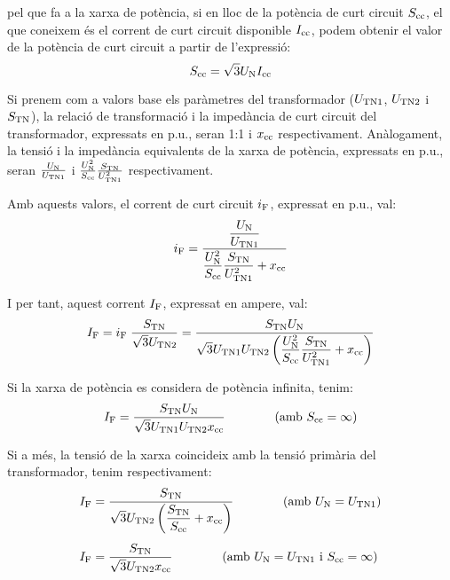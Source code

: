 pel que fa a la xarxa de pot\`{e}ncia, si en lloc de la pot\`{e}ncia de curt
circuit $S_\mathrm{cc}$, el que coneixem \'{e}s el corrent de curt circuit
disponible $I_\mathrm{cc}$, podem obtenir el valor de la pot\`{e}ncia de
curt circuit a partir de l'expressi\'{o}:
\begin{equation}
    S_\mathrm{cc} = \sqrt{3} U_\mathrm{N} I_\mathrm{cc}
\end{equation}

 Si prenem com a valors base els
par\`{a}metres del transformador ($U_\mathrm{TN1}$, $U_\mathrm{TN2}$ i
$S_\mathrm{TN}$), la relaci\'{o} de transformaci\'{o} i la imped\`{a}ncia de curt
circuit del transformador, expressats en p.u., seran 1:1 i
$x_\mathrm{cc}$ respectivament. An\`{a}logament, la tensi\'{o} i la imped\`{a}ncia
equivalents de la xarxa de pot\`{e}ncia, expressats en p.u., seran
$\frac{U_\mathrm{N}}{U_\mathrm{TN1}}$ i $\frac{U_\mathrm{N}^2}{S_\mathrm{cc}}
\frac{S_\mathrm{TN}}{U_\mathrm{TN1}^2}$ respectivament.

Amb aquests valors, el corrent de curt circuit $i_\mathrm{F}$, expressat
en p.u., val:
\begin{equation}
    i_\mathrm{F} = \frac{\dfrac{U_\mathrm{N}}{U_\mathrm{TN1}}}{\dfrac{U_\mathrm{N}^2}{S_\mathrm{cc}}
    \dfrac{S_\mathrm{TN}}{U_\mathrm{TN1}^2} + x_\mathrm{cc}}
\end{equation}

I per tant, aquest corrent $I_\mathrm{F}$, expressat en ampere, val:
\begin{equation}
    I_\mathrm{F} = i_\mathrm{F}\; \frac{S_\mathrm{TN}}{\sqrt{3}U_\mathrm{TN2}} =
    \frac{S_\mathrm{TN} U_\mathrm{N}}{\sqrt{3} U_\mathrm{TN1}U_\mathrm{TN2}
    \left(\dfrac{U_\mathrm{N}^2}{S_\mathrm{cc}}
    \dfrac{S_\mathrm{TN}}{U_\mathrm{TN1}^2} + x_\mathrm{cc}\right)}
\end{equation}

Si la xarxa de pot\`{e}ncia es considera de pot\`{e}ncia infinita, tenim:
\begin{equation}
    I_\mathrm{F} = \frac{S_\mathrm{TN} U_\mathrm{N}}{\sqrt{3} U_\mathrm{TN1}U_\mathrm{TN2}
    x_\mathrm{cc}}\qquad\qquad (\text{amb }S_\mathrm{cc}=\infty)
\end{equation}

Si a m\'{e}s, la tensi\'{o} de la xarxa coincideix amb la tensi\'{o} prim\`{a}ria
del transformador, tenim respectivament:
\begin{align}
    I_\mathrm{F} &= \frac{S_\mathrm{TN}}{\sqrt{3} U_\mathrm{TN2}
    \left(\dfrac{S_\mathrm{TN}}{S_\mathrm{cc}} +
    x_\mathrm{cc}\right)}\qquad\qquad(\text{amb }U_\mathrm{N}=U_\mathrm{TN1})\\[1ex]
    I_\mathrm{F} &= \frac{S_\mathrm{TN}}{\sqrt{3} U_\mathrm{TN2}
    x_\mathrm{cc}}\qquad\qquad(\text{amb }U_\mathrm{N}=U_\mathrm{TN1}\text{ i }
    S_\mathrm{cc}=\infty)
\end{align}

